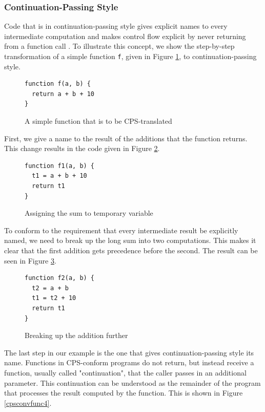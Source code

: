 \documentclass[11pt]{report}
\begin{document}
\subsubsection{Continuation-Passing Style}
Code that is in continuation-passing style gives explicit names to every intermediate computation and makes control flow explicit by never returning from a function call \cite{Morrisett:1999:SFT:319301.319345, DBLP:books/daglib/0022396}. To illustrate this concept, we show the step-by-step transformation of a simple function \texttt{f}, given in Figure \ref{cpsconvfunc1}, to continuation-passing style.

\begin{figure}[ht]
\begin{lstlisting}
function f(a, b) {
  return a + b + 10
}
\end{lstlisting}
\caption{A simple function that is to be CPS-translated}
\label{cpsconvfunc1}
\end{figure}

First, we give a name to the result of the additions that the function returns. This change results in the code given in Figure \ref{cpsconvfunc2}.

\begin{figure}[ht]
\begin{lstlisting}
function f1(a, b) {
  t1 = a + b + 10
  return t1
}
\end{lstlisting}
\caption{Assigning the sum to temporary variable}
\label{cpsconvfunc2}
\end{figure}

To conform to the requirement that every intermediate result be explicitly named, we need to break up the long sum into two computations. This makes it clear that the first addition gets precedence before the second. The result can be seen in Figure \ref{cpsconvfunc3}.

\begin{figure}[ht]
\begin{lstlisting}
function f2(a, b) {
  t2 = a + b
  t1 = t2 + 10
  return t1
}
\end{lstlisting}
\caption{Breaking up the addition further}
\label{cpsconvfunc3}
\end{figure}

The last step in our example is the one that gives continuation-passing style its name. Functions in CPS-conform programs do not return, but instead receive a function, usually called "continuation", that the caller passes in an additional parameter. This continuation can be understood as the remainder of the program that processes the result computed by the function. This is shown in Figure \ref{cpsconvfunc4}.
\end{document}
